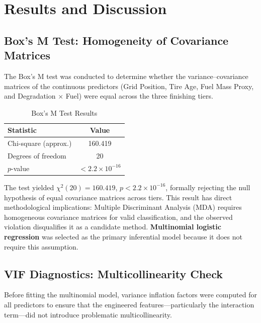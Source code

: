 \section{Results and Discussion}

\subsection{Box's M Test: Homogeneity of Covariance Matrices}

The Box's M test was conducted to determine whether the variance--covariance
matrices of the continuous predictors (Grid Position, Tire Age, Fuel Mass
Proxy, and Degradation $\times$ Fuel) were equal across the three finishing
tiers.

\begin{table}[htbp]
  \centering
  \caption{Box's M Test Results}
  \label{tab:boxs-m}
  \begin{tabular}{lc}
    \toprule
    \textbf{Statistic} & \textbf{Value} \\
    \midrule
    Chi-square (approx.) & 160.419 \\
    Degrees of freedom   & 20 \\
    $p$-value            & $< 2.2 \times 10^{-16}$ \\
    \bottomrule
  \end{tabular}
\end{table}

The test yielded $\chi^{2}(20) = 160.419$, $p < 2.2 \times 10^{-16}$,
formally rejecting the null hypothesis of equal covariance matrices across
tiers. This result has direct methodological implications: Multiple
Discriminant Analysis (MDA) requires homogeneous covariance matrices for valid
classification, and the observed violation disqualifies it as a candidate
method. \textbf{Multinomial logistic regression} was selected as the primary
inferential model because it does not require this assumption.

\subsection{VIF Diagnostics: Multicollinearity Check}

Before fitting the multinomial model, variance inflation factors were computed
for all predictors to ensure that the engineered features---particularly the
interaction term---did not introduce problematic multicollinearity.

